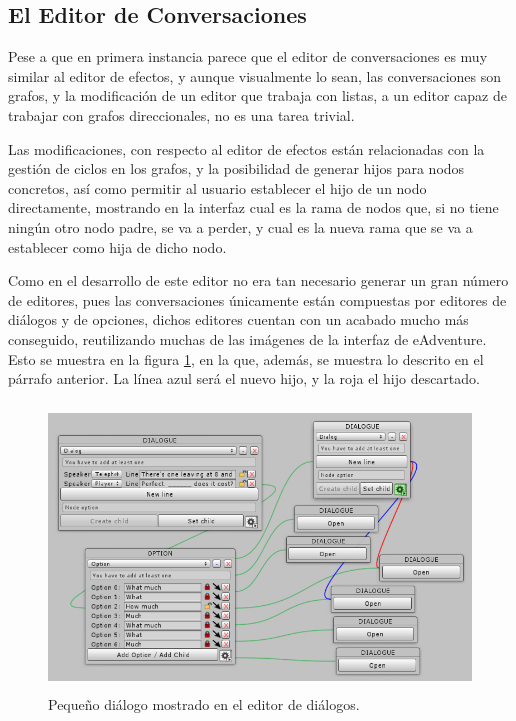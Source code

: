 \subsection{El Editor de Conversaciones}

Pese a que en primera instancia parece que el editor de conversaciones es muy similar al editor de efectos, y aunque visualmente lo sean, las conversaciones son grafos, y la modificación de un editor que trabaja con listas, a un editor capaz de trabajar con grafos direccionales, no es una tarea trivial. 

Las modificaciones, con respecto al editor de efectos están relacionadas con la gestión de ciclos en los grafos, y la posibilidad de generar hijos para nodos concretos, así como permitir al usuario establecer el hijo de un nodo directamente, mostrando en la interfaz cual es la rama de nodos que, si no tiene ningún otro nodo padre, se va a perder, y cual es la nueva rama que se va a establecer como hija de dicho nodo.

Como en el desarrollo de este editor no era tan necesario generar un gran número de editores, pues las conversaciones únicamente están compuestas por editores de diálogos y de opciones, dichos editores cuentan con un acabado mucho más conseguido, reutilizando muchas de las imágenes de la interfaz de eAdventure. Esto se muestra en la figura \ref{small-dialogeditor-it3}, en la que, además, se muestra lo descrito en el párrafo anterior. La línea azul será el nuevo hijo, y la roja el hijo descartado.

\begin{figure}[h!]
	\centerline{\includegraphics[height=3in]{figures/it3/small-dialog.png}}
	\caption[Pequeño diálogo - Editor de Diálogos]{Pequeño diálogo mostrado en el editor de diálogos.}
	\label{small-dialogeditor-it3}
\end{figure}

